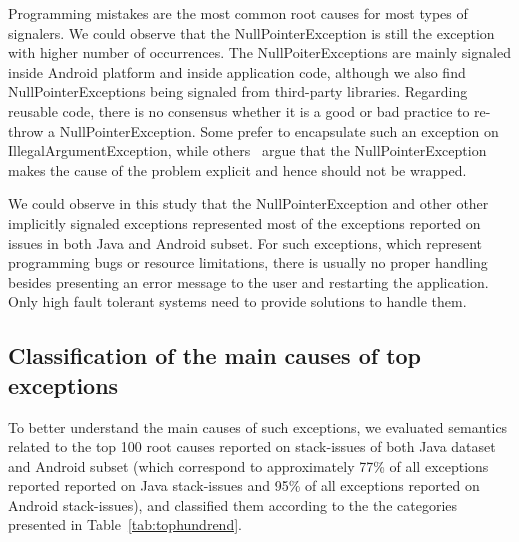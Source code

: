 \documentclass[conference]{IEEEtran}
\begin{document}

Programming mistakes are the most common root causes for most types of signalers. We
could observe that the NullPointerException is still the exception with higher
number of occurrences. The NullPoiterExceptions are mainly signaled inside
Android platform and inside application code, although we also find
NullPointerExceptions being signaled from third-party libraries. Regarding
reusable code, there is no consensus whether it is a good or bad practice to 
re-throw
a NullPointerException. Some prefer to encapsulate such an exception on
IllegalArgumentException, while others~\cite{bloch2008effective} argue that the
NullPointerException makes the cause of the problem explicit and hence 
should not be wrapped.

We could observe in this study that the NullPointerException and other
other implicitly signaled exceptions represented most of the exceptions reported
on issues in both Java and Android subset. For such exceptions, which represent
programming bugs or resource limitations, there is usually no proper handling
besides presenting an error message to the user and restarting the application.
Only high fault tolerant systems need to provide solutions to handle them.

\subsection{Classification of the main causes of top exceptions}

To better understand the main causes of such exceptions, we evaluated semantics
related to the top 100 root causes reported on stack-issues of both Java dataset
and Android subset (which correspond to approximately 77\% of all exceptions
reported reported on Java stack-issues and 95\% of all exceptions reported on
Android stack-issues), and classified them according to the the categories
presented in Table~\ref{tab:tophundrend}.
\end{document}
